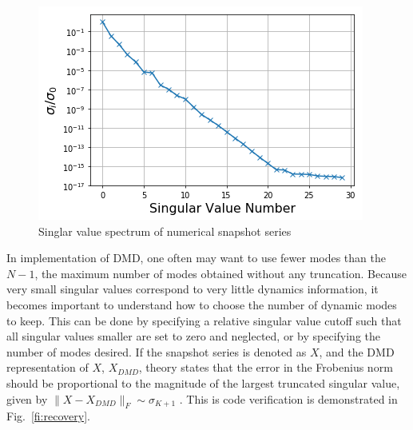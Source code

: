 \documentclass[12pt]{article}
\newcommand{\LFI}[1]{\label{fi:#1}}
\newcommand{\FI}[1]{Fig.~\ref{fi:#1}}
\newcommand{\bfg}{\begin{figure}}
\newcommand{\efg}{\end{figure}}
\begin{document}
\bfg[h] \centering
	\includegraphics[scale=0.5]{singularValueSpectrum_flux.png}
	\caption{Singlar value spectrum of numerical snapshot series}
	\LFI{sv-spec}
\efg

In implementation of DMD, one often may want to use fewer modes than the $N-1$, 
	the maximum number of modes obtained without any truncation. 
Because very small singular values correspond to very little dynamics 
	information, it becomes important to understand how to choose the number of 
	dynamic modes to keep.
This can be done by specifying a relative singular value cutoff such that all 
	singular values smaller are set to zero and neglected, or by specifying the 
	number of modes desired.
If the snapshot series is denoted as $X$, and the DMD representation of $X$, 
	$X_{DMD}$, theory states that the error in the Frobenius norm should be 
	proportional to the magnitude of the largest truncated singular value, given 
	by $\lVert X - X_{DMD} \rVert_F \sim \sigma_{K+1}$ \cite{dmd2016} .
This is code verification is demonstrated in \FI{recovery}.
\end{document}
